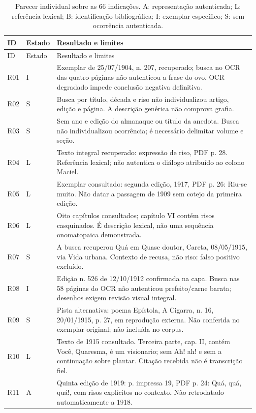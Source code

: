 \small\begin{longtable}{p{}p{}p{}}
\caption{Parecer individual sobre as 66 indicações. A: representação autenticada; L: referência lexical; B: identificação bibliográfica; I: exemplar específico; S: sem ocorrência autenticada.}\\
\toprule ID & Estado & Resultado e limites \\\midrule\endfirsthead
\toprule ID & Estado & Resultado e limites \\\midrule\endhead
R01 & I & Exemplar de 25/07/1904, n. 207, recuperado; busca no OCR das quatro páginas não autenticou a frase do ovo. OCR degradado impede conclusão negativa definitiva.\\
R02 & S & Busca por título, década e riso não individualizou artigo, edição e página. A descrição genérica não comprova grafia.\\
R03 & S & Sem ano e edição do almanaque ou título da anedota. Busca não individualizou ocorrência; é necessário delimitar volume e seção.\\
R04 & L & Texto integral recuperado: expressão de riso, PDF p. 28. Referência lexical; não autentica o diálogo atribuído ao colono Maciel.\\
R05 & L & Exemplar consultado: segunda edição, 1917, PDF p. 26: Riu-se muito. Não datar a passagem de 1909 sem cotejo da primeira edição.\\
R06 & L & Oito capítulos consultados; capítulo VI contém risos casquinados. É descrição lexical, não uma sequência onomatopaica demonstrada.\\
R07 & S & A busca recuperou Quá em Quase doutor, Careta, 08/05/1915, via Vida urbana. Contexto de recusa, não riso: falso positivo excluído.\\
R08 & I & Edição n. 526 de 12/10/1912 confirmada na capa. Busca nas 58 páginas do OCR não autenticou prefeito/carne barata; desenhos exigem revisão visual integral.\\
R09 & S & Pista alternativa: poema Epístola, A Cigarra, n. 16, 20/01/1915, p. 27, em reprodução externa. Não conferida no exemplar original; não incluída no corpus.\\
R10 & L & Texto de 1915 consultado. Terceira parte, cap. II, contém Você, Quaresma, é um visionario; sem Ah! ah! e sem a continuação sobre plantar. Citação recebida não é transcrição fiel.\\
R11 & A & Quinta edição de 1919: p. impressa 19, PDF p. 24: Quá, quá, quá!, com risos explícitos no contexto. Não retrodatado automaticamente a 1918.\\

\end{longtable}
